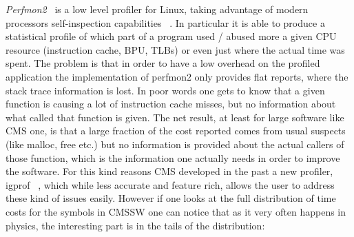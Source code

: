 \documentclass[a4paper]{jpconf}
\begin{document}
{\itshape Perfmon2}~\cite{Eranian:2006p467} is a low level profiler for Linux, taking advantage of modern processors self-inspection capabilities ~\cite{Anderson:1997}. In particular it is able to produce a statistical profile of which part of a program used / abused more a given CPU resource (instruction cache, BPU, TLBs) or even just where the actual time was spent.
The problem is that in order to have a low overhead on the profiled application the implementation of perfmon2 only provides flat reports, where the stack trace information is lost. In poor words one gets to know that a given function is causing a lot of instruction cache misses, but no information about what called that function is given. The net result, at least for large software like CMS one, is that a large fraction of the cost reported comes from usual suspects (like malloc, free etc.) but no information is provided about the actual callers of those function, which is the information one actually needs in order to improve the software. For this kind reasons CMS developed in the past a new profiler, igprof ~\cite{Eulisse:2004igprof}, which while less accurate and feature rich, allows the user to address these kind of issues easily. However if one looks at the full distribution of time costs for the symbols in CMSSW one can notice that as it very often happens in physics, the interesting part is in the tails of the distribution:


\begin{figure}
\caption{}
\label{}
\begin{center}
\end{center}
\end{figure}
\end{document}
